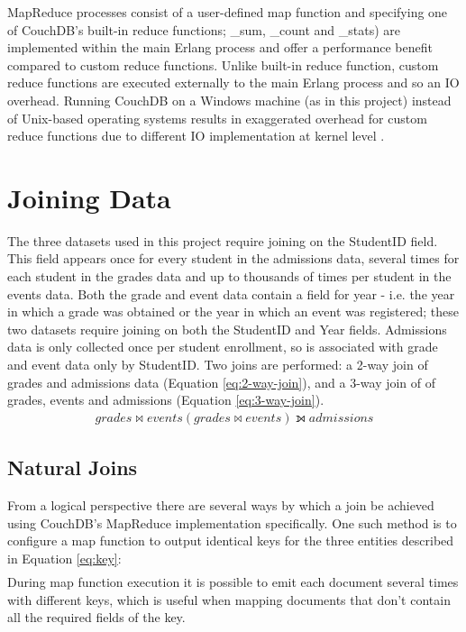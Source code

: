 MapReduce processes consist of a user-defined map function and specifying one of CouchDB's built-in reduce functions; \_sum, \_count and \_stats) are implemented within the main Erlang process and offer a performance benefit compared to custom reduce functions. Unlike built-in reduce function, custom reduce functions are executed externally to the main Erlang process and so an IO overhead. Running CouchDB on a Windows machine (as in this project) instead of Unix-based operating systems results in exaggerated overhead for custom reduce functions due to different IO implementation at kernel level \cite{slack1Nov}.

\section{Joining Data}
The three datasets used in this project require joining on the StudentID field. This field appears once for every student in the admissions data, several times for each student in the grades data and up to thousands of times per student in the events data. Both the grade and event data contain a field for year - i.e. the year in which a grade was obtained or the year in which an event was registered; these two datasets require joining on both the StudentID and Year fields. Admissions data is only collected once per student enrollment, so is associated with grade and event data only by StudentID. Two joins are performed: a 2-way join of grades and admissions data (Equation \ref{eq:2-way-join}), and a 3-way join of of grades, events and admissions (Equation \ref{eq:3-way-join}).
\begin{align}
  grades \bowtie events\label{eq:2-way-join}
  (grades \bowtie events) \leftouterjoin admissions\label{eq:3-way-join}
\end{align}

\subsection{Natural Joins}
From a logical perspective there are several ways by which a join be achieved using CouchDB's MapReduce implementation specifically. One such method is to configure a map function to output identical keys for the three entities described in Equation \ref{eq:key}:
\begin{align}
  [studentNumber,courseCode,year]\label{eq:key}
\end{align}
During map function execution it is possible to emit each document several times with different keys, which is useful when mapping documents that don't contain all the required fields of the key.

